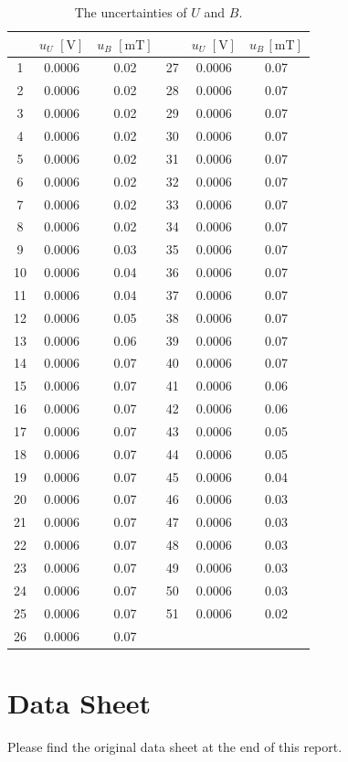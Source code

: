 \documentclass{article}
\begin{document}
\begin{table}[htbp]
\centering
\begin{tabular}{ccc||ccc}
\toprule
& $u_U\,\,[\text{V}]$ & $u_B\,\,[\text{mT}]$ & &  $u_U\,\,[\text{V}]$ & $u_B\,[\text{mT}]$\\
\midrule
    1     & 0.0006 & 0.02 & 27    & 0.0006 & 0.07 \\
    2     & 0.0006 & 0.02 & 28    & 0.0006 & 0.07 \\
    3     & 0.0006 & 0.02 & 29    & 0.0006 & 0.07 \\
    4     & 0.0006 & 0.02 & 30    & 0.0006 & 0.07 \\
    5     & 0.0006 & 0.02 & 31    & 0.0006 & 0.07 \\
    6     & 0.0006 & 0.02 & 32    & 0.0006 & 0.07 \\
    7     & 0.0006 & 0.02 & 33    & 0.0006 & 0.07 \\
    8     & 0.0006 & 0.02 & 34    & 0.0006 & 0.07 \\
    9     & 0.0006 & 0.03 & 35    & 0.0006 & 0.07 \\
    10    & 0.0006 & 0.04 & 36    & 0.0006 & 0.07 \\
    11    & 0.0006 & 0.04 & 37    & 0.0006 & 0.07 \\
    12    & 0.0006 & 0.05 & 38    & 0.0006 & 0.07 \\
    13    & 0.0006 & 0.06 & 39    & 0.0006 & 0.07 \\
    14    & 0.0006 & 0.07 & 40    & 0.0006 & 0.07 \\
    15    & 0.0006 & 0.07 & 41    & 0.0006 & 0.06 \\
    16    & 0.0006 & 0.07 & 42    & 0.0006 & 0.06 \\
    17    & 0.0006 & 0.07 & 43    & 0.0006 & 0.05 \\
    18    & 0.0006 & 0.07 & 44    & 0.0006 & 0.05 \\
    19    & 0.0006 & 0.07 & 45    & 0.0006 & 0.04 \\
    20    & 0.0006 & 0.07 & 46    & 0.0006 & 0.03 \\
    21    & 0.0006 & 0.07 & 47    & 0.0006 & 0.03 \\
    22    & 0.0006 & 0.07 & 48    & 0.0006 & 0.03 \\
    23    & 0.0006 & 0.07 & 49    & 0.0006 & 0.03 \\
    24    & 0.0006 & 0.07 & 50    & 0.0006 & 0.03 \\
    25    & 0.0006 & 0.07 & 51    & 0.0006 & 0.02 \\
    26    & 0.0006 & 0.07 \\
\bottomrule
\end{tabular}
\caption{The uncertainties of $U$ and $B$.}\label{TableUncUB}
\end{table}

		\section{Data Sheet}
	
Please find the original data sheet at the end of this report.
\end{document}
